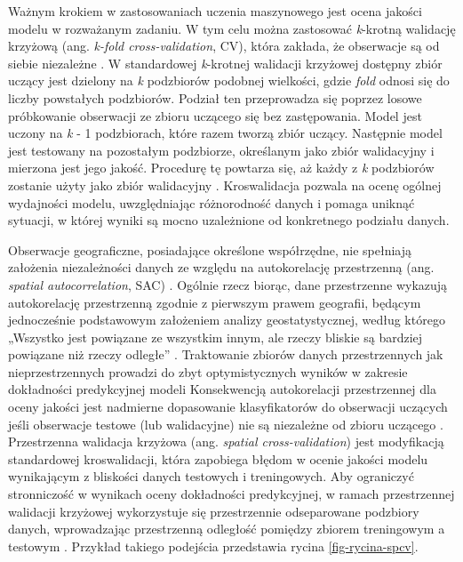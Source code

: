 \documentclass{amuthesis}
\begin{document}
Ważnym krokiem w zastosowaniach uczenia maszynowego jest ocena jakości
modelu w rozważanym zadaniu. W tym celu można zastosować \emph{k}-krotną
walidację krzyżową (ang. \emph{k-fold cross-validation}, CV), która
zakłada, że obserwacje są od siebie niezależne
\autocite{pohjankukka_2017_scv}. W standardowej \emph{k}-krotnej
walidacji krzyżowej dostępny zbiór uczący jest dzielony na \emph{k}
podzbiorów podobnej wielkości, gdzie \emph{fold} odnosi się do liczby
powstałych podzbiorów. Podział ten przeprowadza się poprzez losowe
próbkowanie obserwacji ze zbioru uczącego się bez zastępowania. Model
jest uczony na \emph{k} - 1 podzbiorach, które razem tworzą zbiór
uczący. Następnie model jest testowany na pozostałym podzbiorze,
określanym jako zbiór walidacyjny i mierzona jest jego jakość. Procedurę
tę powtarza się, aż każdy z \emph{k} podzbiorów zostanie użyty jako
zbiór walidacyjny \autocite{berrar_2018_cv}. Kroswalidacja pozwala na
ocenę ogólnej wydajności modelu, uwzględniając różnorodność danych i
pomaga uniknąć sytuacji, w której wyniki są mocno uzależnione od
konkretnego podziału danych.

Obserwacje geograficzne, posiadające określone współrzędne, nie
spełniają założenia niezależności danych ze względu na autokorelację
przestrzenną (ang. \emph{spatial autocorrelation}, SAC)
\autocite{pohjankukka_2017_scv}. Ogólnie rzecz biorąc, dane przestrzenne
wykazują autokorelację przestrzenną zgodnie z pierwszym prawem
geografii, będącym jednocześnie podstawowym założeniem analizy
geostatystycznej, według którego „Wszystko jest powiązane ze wszystkim
innym, ale rzeczy bliskie są bardziej powiązane niż rzeczy odległe''
\autocite{tobler_1970_first_law_of_geography}. Traktowanie zbiorów
danych przestrzennych jak nieprzestrzennych prowadzi do zbyt
optymistycznych wyników w zakresie dokładności predykcyjnej modeli
\autocite{brenning_2005_scv} Konsekwencją autokorelacji przestrzennej
dla oceny jakości jest nadmierne dopasowanie klasyfikatorów do
obserwacji uczących jeśli obserwacje testowe (lub walidacyjne) nie są
niezależne od zbioru uczącego \autocite{brenning_2012_scv}. Przestrzenna
walidacja krzyżowa (ang. \emph{spatial cross-validation}) jest
modyfikacją standardowej kroswalidacji, która zapobiega błędom w ocenie
jakości modelu wynikającym z bliskości danych testowych i treningowych.
Aby ograniczyć stronniczość w wynikach oceny dokładności predykcyjnej, w
ramach przestrzennej walidacji krzyżowej wykorzystuje się przestrzennie
odseparowane podzbiory danych, wprowadzając przestrzenną odległość
pomiędzy zbiorem treningowym a testowym \autocite{pohjankukka_2017_scv}.
Przykład takiego podejścia przedstawia rycina \ref{fig-rycina-spcv}.
\end{document}
